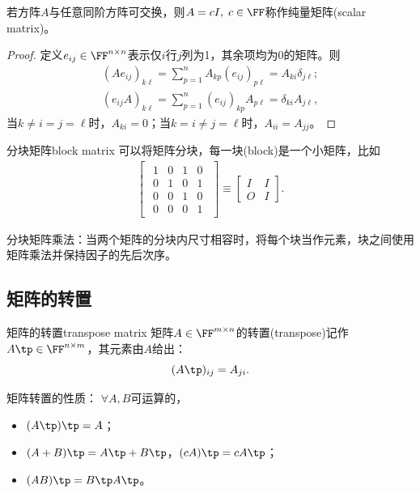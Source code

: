 \begin{theorem}{}{}
	若方阵$A$与任意同阶方阵可交换，则$A=cI,\;c\in\FF$称作纯量矩阵(scalar matrix)。
\end{theorem}
\begin{proof}
	定义$e_{ij}\in\FF^{n\times n}$表示仅$i$行$j$列为1，其余项均为0的矩阵。则
	\begin{align*}
		(Ae_{ij})_{k\ell}=\sum_{p=1}^nA_{kp}(e_{ij})_{p\ell}=A_{ki}\delta_{j\ell};\\
		(e_{ij}A)_{k\ell}=\sum_{p=1}^n(e_{ij})_{kp}A_{p\ell}=\delta_{ki}A_{j\ell},
	\end{align*}
	当$k\neq i=j=\ell$时，$A_{ki}=0$；当$k=i\neq j=\ell$时，$A_{ii}=A_{jj}$。
\end{proof}
\begin{definition}{分块矩阵}{block matrix}
	可以将矩阵分块，每一块(block)是一个小矩阵，比如
	\begin{align*}
		\begin{bmatrix}
			\begin{array}{cc|cc}
				1&0&1&0\\
				0&1&0&1\\
				\hline
				0&0&1&0\\
				0&0&0&1	
			\end{array}
		\end{bmatrix}
		\equiv
		\begin{bmatrix}
			I&I\\O&I
		\end{bmatrix}.
	\end{align*}
\end{definition}

\begin{remark}
	分块矩阵乘法：当两个矩阵的分块内尺寸相容时，将每个块当作元素，块之间使用矩阵乘法并保持因子的先后次序。
\end{remark}

\subsection{矩阵的转置}

\begin{definition}{矩阵的转置}{transpose matrix}
	矩阵$A\in\FF^{m\times n}$的转置(transpose)记作$A\tp\in\FF^{n\times m}$，其元素由$A$给出：
	\[
		(A\tp)_{ij}=A_{ji}.
	\]
\end{definition}
\begin{corollary}
	矩阵转置的性质：%
	$\forall A,B$可运算的，
	\begin{itemize}
		\item $(A\tp)\tp=A$；
		\item $(A+B)\tp=A\tp+B\tp$，$(cA)\tp=cA\tp$；
		\item $(AB)\tp=B\tp A\tp$。
	\end{itemize}
\end{corollary}

